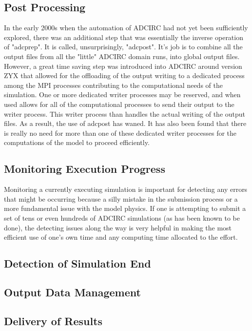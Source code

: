 \documentclass{article}
\begin{document}
\subsection{Post Processing}

In the early 2000s when the automation of ADCIRC had not yet been sufficiently
explored, there was an additional step that was essentially the inverse
operation of "adcprep". It is called, unsurprisingly, "adcpost". It's job is to
combine all the output files from all the "little" ADCIRC domain runs, into
global output files. However, a great time saving step was introduced into
ADCIRC around version ZYX \cite{} that allowed for the offloading of the output
writing to a dedicated process among the MPI processes contributing to the
computational needs of the simulation. One or more dedicated writer processes
may be reserved, and when used allows for all of the computational processes to
send their output to the writer process. This writer process than handles the
actual writing of the output files. As a result, the use of adcpost has waned.
It has also been found that there is really no need for more than one of these
dedicated writer processes for the computations of the model to proceed
efficiently.

\subsection{Monitoring Execution Progress}

Monitoring a currently executing simulation is important for detecting any
errors that might be occurring because a silly mistake in the submission process
or a more fundamental issue with the model physics. If one is attempting to
submit a set of tens or even hundreds of ADCIRC simulations (as has been known
to be done), the detecting issues along the way is very helpful in making the
most efficient use of one's own time and any computing time allocated to the
effort.

\subsection{Detection of Simulation End}

\subsection{Output Data Management}

\subsection{Delivery of Results}
\end{document}
